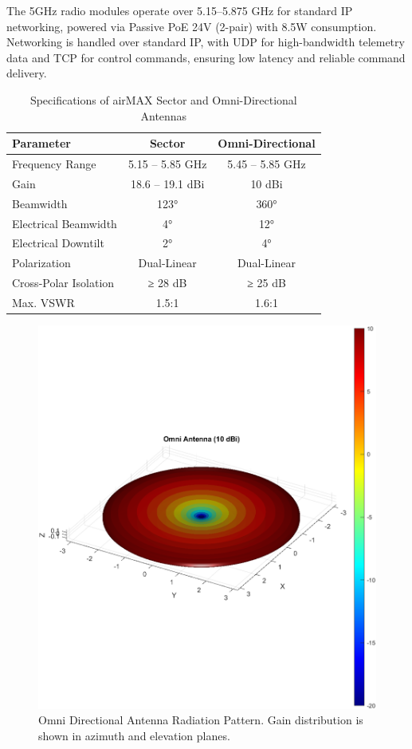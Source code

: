 \documentclass[letterpaper, 10 pt, conference]{ieeeconf}  %
\begin{document}
The 5GHz radio modules operate over 5.15–5.875 GHz for standard IP networking, powered via Passive PoE 24V (2-pair) with 8.5W consumption. Networking is handled over standard IP, with UDP for high-bandwidth telemetry data and TCP for control commands, ensuring low latency and reliable command delivery.



\begin{table}[h!]
\centering
\caption{Specifications of airMAX Sector and Omni-Directional Antennas}
\begin{tabular}{|l|c|c|}
\hline
\textbf{Parameter} & \textbf{Sector} & \textbf{Omni-Directional} \\ \hline
Frequency Range & 5.15 – 5.85 GHz & 5.45 – 5.85 GHz \\ \hline
Gain & 18.6 – 19.1 dBi & 10 dBi \\ \hline
Beamwidth & 123° & 360° \\ \hline
Electrical Beamwidth & 4° & 12° \\ \hline
Electrical Downtilt & 2° & 4° \\ \hline
Polarization & Dual-Linear & Dual-Linear \\ \hline
Cross-Polar Isolation & ≥ 28 dB & ≥ 25 dB \\ \hline
Max. VSWR & 1.5:1 & 1.6:1 \\ \hline
\end{tabular}
\end{table}


\begin{figure}[htbp]
    \centering
    \includegraphics[width=0.7\linewidth]{figures/omni.png}
    \caption{Omni Directional Antenna Radiation Pattern. Gain distribution is shown in azimuth and elevation planes.}
    \label{fig:placeholder}
\end{figure}
\end{document}
